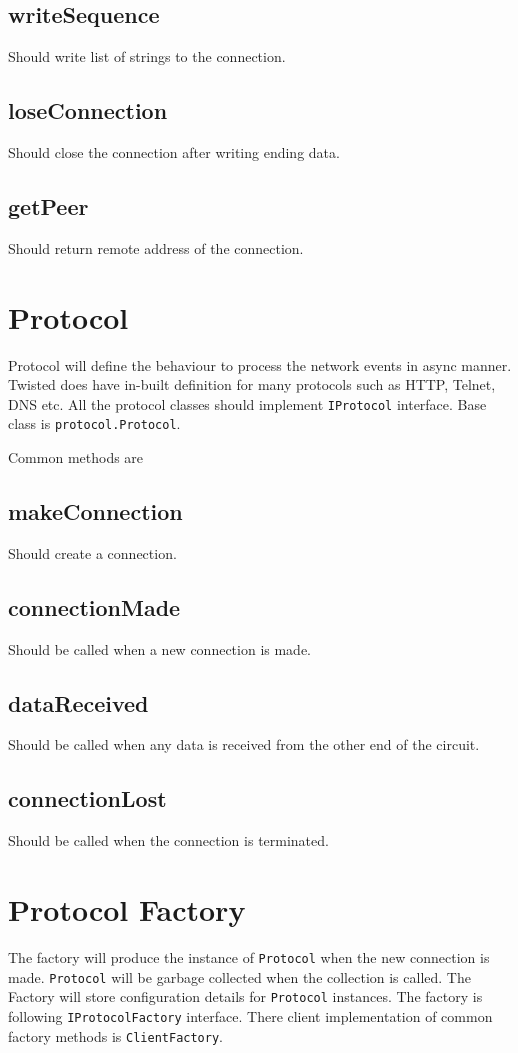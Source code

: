 \documentclass{article}
\begin{document}
    \subsection {writeSequence} Should write list of strings to the connection.

    \subsection{loseConnection} Should close the connection after writing
    ending data.

    \subsection{getPeer} Should return remote address of the connection.

  \section{Protocol}
    Protocol will define the behaviour to process the network events in async
    manner. Twisted does have in-built definition for many protocols such as
    HTTP, Telnet, DNS etc. All the protocol classes should implement
    \texttt{IProtocol} interface. Base class is \texttt{protocol.Protocol}.

    Common methods are

    \subsection{makeConnection} Should create a connection.

    \subsection{connectionMade} Should be called when a new connection is made.

    \subsection{dataReceived} Should be called when any data is received from
    the other end of the circuit.

    \subsection{connectionLost} Should be called when the connection is
    terminated.

  \section{Protocol Factory}
    The factory will produce the instance of \texttt{Protocol} when the new
    connection is made. \texttt{Protocol} will be garbage collected when the
    collection is called. The Factory will store configuration details for
    \texttt{Protocol} instances. The factory is following
    \texttt{IProtocolFactory} interface. There client implementation of common
    factory methods is \texttt{ClientFactory}.
\end{document}
